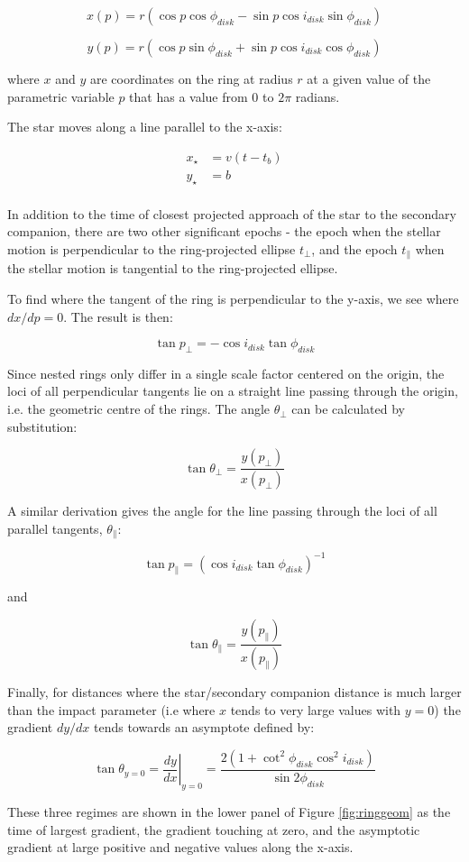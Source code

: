 \documentclass{emulateapj}
\newcommand{\tb}{t_\bot}
\newcommand{\tp}{t_\parallel}
\newcommand{\id}{i_{disk}}
\newcommand{\pd}{\phi_{disk}}
\begin{document}
$$x(p) = r(\cos p \cos \pd - \sin p \cos \id \sin \pd)$$

$$y(p) = r(\cos p \sin \pd + \sin p \cos \id \cos \pd)$$

where $x$ and $y$ are coordinates on the ring at radius $r$ at a given
value of the parametric variable $p$ that has a value from $0$ to
$2\pi$ radians.

The star moves along a line parallel to the x-axis:

$$
\begin{array}{rl}
 x_\star & = v(t - t_b) \\
 y_\star & = b\\
\end{array}
$$

In addition to the time of closest projected approach of the star to
the secondary companion, there are two other significant epochs - the
epoch when the stellar motion is perpendicular to the ring-projected
ellipse $\tb$, and the epoch $\tp$ when the stellar motion is
tangential to the ring-projected ellipse.

To find where the tangent of the ring is perpendicular to the y-axis,
we see where $dx/dp=0$.  The result is then:

$$ \tan p_\bot = -\cos \id \tan \pd $$

Since nested rings only differ in a single scale factor centered on
the origin, the loci of all perpendicular tangents lie on a straight
line passing through the origin, i.e. the geometric centre of the
rings.
The angle $\theta_\bot$ can be calculated by substitution:

$$ \tan \theta_\bot = \frac{y(p_\bot)}{x(p_\bot)} $$

A similar derivation gives the angle for the line passing through the
loci of all parallel tangents, $\theta_\parallel$:

$$ \tan p_\parallel = (\cos \id \tan \pd)^{-1} $$


and

$$ \tan \theta_\parallel = \frac{y(p_\parallel)}{x(p_\parallel)} $$

Finally, for distances where the star/secondary companion distance is
much larger than the impact parameter (i.e where $x$ tends to very
large values with $y=0$) the gradient $dy/dx$ tends towards an
asymptote defined by:

$$ \tan \theta_{y=0} = \left. \frac{dy}{dx} \right |_{y=0} = \frac{2(1 +
\cot^2 \pd \cos^2 \id)}{\sin 2\pd} $$

These three regimes are shown in the lower panel of Figure
\ref{fig:ringgeom} as the time of largest gradient, the gradient
touching at zero, and the asymptotic gradient at large positive and
negative values along the x-axis.
\end{document}
